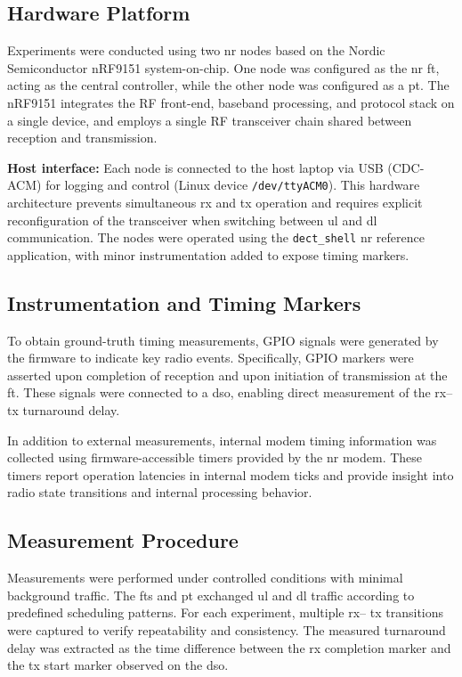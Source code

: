 \documentclass[conference]{IEEEtran}
\begin{document}
\subsection{Hardware Platform}

Experiments were conducted using two \gls{nr} nodes based on the Nordic Semiconductor nRF9151 system-on-chip. One node was configured as the \gls{nr} \gls{ft}, acting as the central controller, while the other node was configured as a \gls{pt}. The nRF9151 integrates the RF front-end, baseband processing, and protocol stack on a single device, and employs a single RF transceiver chain shared between reception and transmission.


\noindent\textbf{Host interface:} Each node is connected to the host laptop via USB (CDC-ACM) for logging and control (Linux device \texttt{/dev/ttyACM0}).
This hardware architecture prevents simultaneous  \gls{rx} and  \gls{tx} operation and requires explicit reconfiguration of the transceiver when switching between \gls{ul} and \gls{dl} communication. The nodes were operated using the \texttt{dect\_shell} \gls{nr} reference application, with minor instrumentation added to expose timing markers.

\subsection{Instrumentation and Timing Markers}

To obtain ground-truth timing measurements, GPIO signals were generated by the firmware to indicate key radio events. Specifically, GPIO markers were asserted upon completion of reception and upon initiation of transmission at the \gls{ft}. These signals were connected to a \gls{dso}, enabling direct measurement of the  \gls{rx}-- \gls{tx} turnaround delay.

In addition to external measurements, internal modem timing information was collected using firmware-accessible timers provided by the \gls{nr} modem. These timers report operation latencies in internal modem ticks and provide insight into radio state transitions and internal processing behavior.


\subsection{Measurement Procedure}

Measurements were performed under controlled conditions with minimal background traffic. The \glspl{ft} and \gls{pt} exchanged \gls{ul} and \gls{dl} traffic according to predefined scheduling patterns. For each experiment, multiple  \gls{rx}-- \gls{tx} transitions were captured to verify repeatability and consistency. The measured turnaround delay was extracted as the time difference between the  \gls{rx} completion marker and the  \gls{tx} start marker observed on the \gls{dso}.
\end{document}
